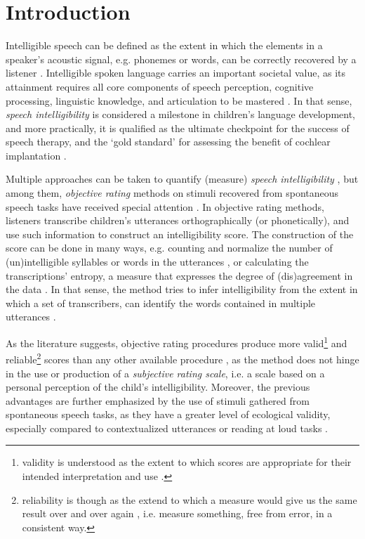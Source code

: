 \section{Introduction} \label{S:introduction}

Intelligible speech can be defined as the extent in which the elements in a speaker's acoustic signal, e.g. phonemes or words, can be correctly recovered by a listener \citep{Freeman_et_al_2017, Kent_et_al_1989, vanHeuven_2008, Whitehill_et_al_2004}. Intelligible spoken language carries an important societal value, as its attainment requires all core components of speech perception, cognitive processing, linguistic knowledge, and articulation to be mastered \citep{Freeman_et_al_2017}. In that sense, \textit{speech intelligibility} is considered a milestone in children's language development, and more practically, it is qualified as the ultimate checkpoint for the success of speech therapy, and the `gold standard' for assessing the benefit of cochlear implantation \citep{Chin_et_al_2012}. 

Multiple approaches can be taken to quantify (measure) \textit{speech intelligibility} \citep{Boonen_et_al_2020, Boonen_et_al_2021, Flipsen_2006, Hustad_et_al_2020}, but among them, \textit{objective rating} methods on stimuli recovered from spontaneous speech tasks have received special attention \citep{Boonen_et_al_2021, Hustad_et_al_2020}. In objective rating methods, listeners transcribe children's utterances orthographically (or phonetically), and use such information to construct an intelligibility score. The construction of the score can be done in many ways, e.g. counting and normalize the number of (un)intelligible syllables or words in the utterances \citep{Flipsen_2006, Lagerberg_et_al_2014}, or calculating the transcriptions' entropy, a measure that expresses the degree of (dis)agreement in the data \citep{Boonen_et_al_2021, Shannon_1948}. In that sense, the method tries to infer intelligibility from the extent in which a set of transcribers, can identify the words contained in multiple utterances \cite{Boonen_et_al_2021}. 

As the literature suggests, objective rating procedures produce more valid\footnote{validity is understood as the extent to which scores are appropriate for their intended interpretation and use \citep{Lesterhuis_2018, Trochim_2022}.} and reliable\footnote{reliability is though as the extend to which a measure would give us the same result over and over again \citep{Trochim_2022}, i.e. measure something, free from error, in a consistent way.} scores than any other available procedure \citep{Boonen_et_al_2021, Faes_et_al_2021}, as the method does not hinge in the use or production of a \textit{subjective rating scale}, i.e. a scale based on a personal perception of the child's intelligibility. Moreover, the previous advantages are further emphasized by the use of stimuli gathered from spontaneous speech tasks, as they have a greater level of ecological validity, especially compared to contextualized utterances or reading at loud tasks \cite{Flipsen_2006, Ertmer_2011}.


